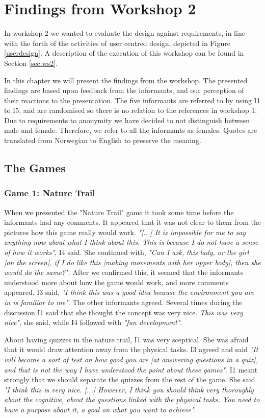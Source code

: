 \chapter{Findings from Workshop 2}
\label{chap:findW2}

In workshop 2 we wanted to evaluate the design against requirements, in line with the forth of the activities of user centred design, depicted in Figure \ref{userdesign}. A description of the execution of this workshop can be found in Section \ref{sec:ws2}. 

In this chapter we will present the findings from the workshop. The presented findings are based upon feedback from the informants, and our perception of their reactions to the presentation. The five informants are referred to by using I1 to I5, and are randomised so there is no relation to the references in workshop 1. Due to requirements to anonymity we have decided to not distinguish between male and female. Therefore, we refer to all the informants as females.  Quotes are translated from Norwegian to English to  preserve the meaning. 

\section{The Games}

\subsection{Game 1: Nature Trail}

When we presented the "Nature Trail" game it took some time before the informants had any comments. It appeared that it was not clear to them from the pictures how this game really would work. \emph{"[...] It is impossible for me to say anything now about what I think about this. This is because I do not have a sense of how it works"}, I4 said. She continued with, \emph{"Can I ask, this lady, or the girl [on the screen], if I do like this [making movements with her upper body], then she would do the same?"}. After we confirmed this, it seemed that the informants understood more about how the game would work, and more comments appeared. I3 said, \emph{"I think this was a good idea because the environment you are in is familiar to me"}. The other informants agreed. Several times during the discussion I1 said that she thought the concept was very nice. \emph{This was very nice"}, she said, while I4 followed with \emph{"fun development"}.  

About having quizzes in the nature trail, I1 was very sceptical. She was afraid that it would draw attention away from the physical tasks. I3 agreed and said \emph{"It will become a sort of test on how good you are [at answering questions in a quiz], and that is not the way I have understood the point about these games"}. I1 meant strongly that we should separate the quizzes from the rest of the game. She said \emph{"I think this is very nice. [...] However, I think you should think very thoroughly about the cognitive, about the questions linked with the physical tasks. You need to have a purpose about it, a goal on what you want to achieve"}. 

